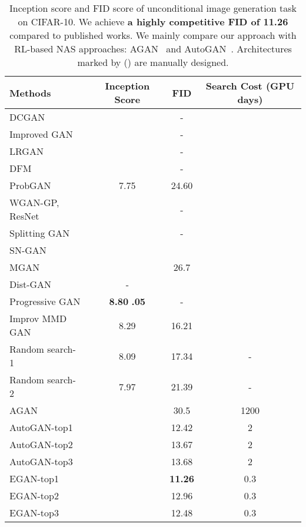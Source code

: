 \documentclass[runningheads]{llncs}
\begin{document}
\begin{table}[b!]
\begin{center}
\begin{tabular}{l|c|c|c}
Methods&Inception Score&FID&Search Cost (GPU days)\\
\hline
DCGAN~\cite{radford2015unsupervised}& &-&\\
Improved GAN~\cite{salimans2016improved}& &-&\\
LRGAN~\cite{yang2017lr}&&-&\\
DFM~\cite{warde2016improving}&&-&\\
ProbGAN~\cite{he2019probgan}& 7.75&24.60 & \\
WGAN-GP, ResNet~\cite{gulrajani2017improved}& &-& \\
Splitting GAN~\cite{grinblat2017class}&  &-&\\
SN-GAN~\cite{miyato2018spectral}&  &&\\
MGAN~\cite{hoang2018mgan}&  &26.7& \\
Dist-GAN~\cite{tran2018dist}&- &&\\
Progressive GAN~\cite{karras2017progressive}&  \textbf{8.80}  \textbf{.05 }&-&\\
Improv MMD GAN~\cite{wang2018improving} & 8.29&16.21&\\
\hline 
\hline
Random search-1~\cite{gong2019autogan}& 8.09 &17.34&-\\
Random search-2~\cite{gong2019autogan}& 7.97 &21.39&-\\
\hline
AGAN~\cite{wang2019agan}&&30.5&1200\\
AutoGAN-top1~\cite{gong2019autogan} &   &12.42&2\\
AutoGAN-top2~\cite{gong2019autogan}& &13.67&2\\
AutoGAN-top3~\cite{gong2019autogan}   &  &13.68&2\\
\hline
EGAN-top1 & &\textbf{11.26}&0.3\\
EGAN-top2 & &12.96&0.3 \\
EGAN-top3 & &12.48&0.3 \\
\end{tabular}
\end{center}
\caption{Inception score and FID score of unconditional image generation task on CIFAR-10. We achieve \textbf{a highly competitive FID of 11.26} compared to published works. We mainly compare our approach with RL-based NAS approaches: AGAN~\cite{wang2019agan} and AutoGAN~\cite{gong2019autogan}. Architectures marked by () are manually designed.}
\label{rcifar}
\end{table}
\end{document}
